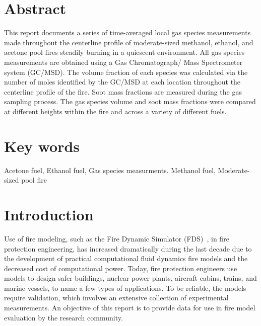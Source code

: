 \documentclass[12pt]{article}
\begin{document}
\section*{Abstract}
This report documents a series of time-averaged local gas species measurements made throughout the centerline profile of moderate-sized methanol, ethanol, and acetone pool fires steadily burning in a quiescent environment. All gas species measurements are obtained using a Gas Chromatograph/ Mass Spectrometer system (GC/MSD). The volume fraction of each species was calculated via the number of moles identified by the GC/MSD at each location throughout the centerline profile of the fire. Soot mass fractions are measured during the gas sampling process. The gas species volume and soot mass fractions were compared at different heights within the fire and across a variety of different fuels.
\section*{Key words}
\normalsize Acetone fuel, Ethanol fuel, Gas species measurments. Methanol fuel, Moderate-sized pool fire\\
\pagebreak
\begin{center}
	\tableofcontents
	\listoftables
	\listoffigures
\end{center}
\pagebreak
\section{Introduction}
\label{sec:intro}
Use of fire modeling, such as the Fire Dynamic Simulator (FDS)~\cite{FDS_Tech_Guide}, in fire protection engineering, has increased dramatically during the last decade due to the development of practical computational fluid dynamics fire models and the decreased cost of computational power. Today, fire protection engineers use models to design safer buildings, nuclear power plants, aircraft cabins, trains, and marine vessels, to name a few types of applications. To be reliable, the models require validation, which involves an extensive collection of experimental measurements. An objective of this report is to provide data for use in fire model evaluation by the research community.
\end{document}
